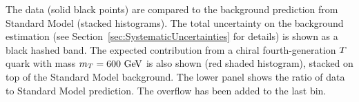         The data (solid black points) are compared to the background 
        prediction from Standard Model (stacked histograms). 
        The total uncertainty on the background estimation (see Section~\ref{sec:SystematicUncertainties} for details) is shown as a black hashed band.
        The expected contribution from a chiral fourth-generation 
        $\T$ quark with mass $m_{\T}=600\gev$ is also shown (red shaded histogram), 
        stacked on top of the Standard Model background. 
        The lower panel shows the ratio of data to Standard Model prediction. 
        The overflow has been added to the last bin.

